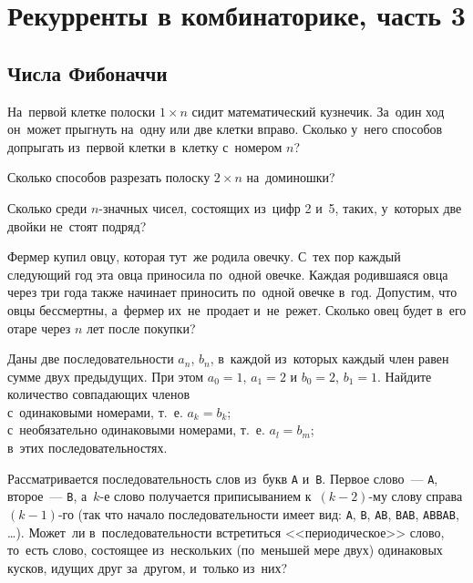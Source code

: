 

\section*{Рекурренты в комбинаторике, часть 3}



\subsection*{Числа Фибоначчи}

\begin{problems}

\item
На~первой клетке полоски $1 \times n$ сидит математический кузнечик.
За~один ход он~может прыгнуть на~одну или две клетки вправо.
Сколько у~него способов допрыгать из~первой клетки в~клетку с~номером $n$?


\item
Сколько способов разрезать полоску $2 \times n$ на~доминошки?

\item
Сколько среди $n$-значных чисел, состоящих из~цифр 2 и~5, таких, у~которых две
двойки не~стоят подряд?

\item
Фермер купил овцу, которая тут~же родила овечку.
С~тех пор каждый следующий год эта овца приносила по~одной овечке.
Каждая родившаяся овца через три года также начинает приносить по~одной овечке
в~год.
Допустим, что овцы бессмертны, а~фермер их~не~продает и~не~режет.
Сколько овец будет в~его отаре через $n$ лет после покупки?

\item
Даны две последовательности $a_n$, $b_n$, в~каждой из~которых каждый член
равен сумме двух предыдущих.
При этом $a_0 = 1$, $a_1 = 2$ и $b_0 = 2$, $b_1 = 1$.
Найдите количество совпадающих членов
\\
\sbp с~одинаковыми номерами, т.~е. $a_k = b_k$;
\\
\sbp с~необязательно одинаковыми номерами, т.~е. $a_l = b_m$;
\\
в~этих последовательностях.

\item
Рассматривается последовательность слов из~букв \texttt{A} и~\texttt{B}.
Первое слово~--- \texttt{A}, второе~--- \texttt{B},
а~$k$-е слово получается приписыванием к~$(k-2)$-му слову справа $(k-1)$-го
(так что начало последовательности имеет вид:
\texttt{A}, \texttt{B}, \texttt{AB}, \texttt{BAB}, \texttt{ABBAB}, \ldots).
Может~ли в~последовательности встретиться <<периодическое>> слово, то~есть
слово, состоящее из~нескольких (по~меньшей мере двух) одинаковых кусков, идущих
друг за~другом, и~только из~них?


\end{problems}
